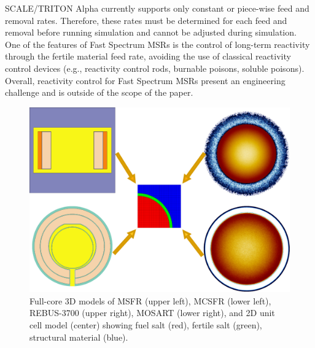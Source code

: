 \documentclass{anstrans}
\begin{document}
SCALE/TRITON Alpha currently supports only constant or piece-wise feed and removal rates. Therefore, these rates must be determined for each feed and removal before running simulation and cannot be adjusted during simulation. One of the features of Fast Spectrum \gls{MSR}s is the control of long-term reactivity through the fertile material feed rate, avoiding the use of classical reactivity control devices (e.g., reactivity control rods, burnable poisons, soluble poisons). Overall, reactivity control for Fast Spectrum \gls{MSR}s present an engineering challenge and is outside of the scope of the paper.
\begin{figure}[!htb]
  \centering
  \includegraphics[scale=0.265]{./Figures/fsmsrs.pdf}
  \caption{Full-core 3D models of \gls{MSFR} (upper left), \gls{MCSFR} (lower left), REBUS-3700 (upper right), \gls{MOSART} (lower right), and 2D unit cell model (center) showing fuel salt (red), fertile salt (green), structural material (blue).}  
  \vspace{-0.15in}
  \label{fig:unit_cell}
\end{figure}
\end{document}

